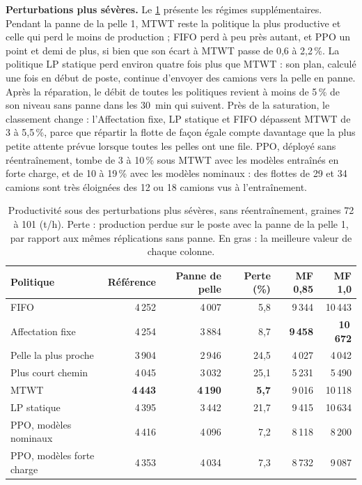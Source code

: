 \documentclass[11pt,a4paper]{article}
\newif\ifcorrmarks
\newcommand{\corr}[1]{\ifcorrmarks\textcolor{corrcolor}{#1}\else#1\fi}
\newenvironment{corrbloc}{\par\ifcorrmarks\color{corrcolor}\fi}{\par}
\begin{document}
\begin{corrbloc}
\textbf{Perturbations plus sévères.} Le \cref{tab:disruptions} présente les régimes supplémentaires. Pendant la panne de la pelle 1, MTWT reste la politique la plus productive et celle qui perd le moins de production ; FIFO perd à peu près autant, et PPO un point et demi de plus, si bien que son écart à MTWT passe de 0,6 à 2,2\,\%. La politique \corr{LP statique} perd environ quatre fois plus que MTWT : son plan, calculé une fois en début de poste, continue d'envoyer des camions vers la pelle en panne. Après la réparation, le débit de toutes les politiques revient à moins de 5\,\% de son niveau sans panne dans les 30~min qui suivent. Près de la saturation, le classement change : l'Affectation fixe, \corr{LP statique} et FIFO dépassent MTWT de 3 à 5,5\,\%, parce que répartir la flotte de façon égale compte davantage que la plus petite attente prévue lorsque toutes les pelles ont une file. PPO, déployé sans réentraînement, tombe de 3 à 10\,\% sous MTWT avec les modèles entraînés en forte charge, et de 10 à 19\,\% avec les modèles nominaux : des flottes de 29 et 34 camions sont très éloignées des 12 ou 18 camions vus à l'entraînement.

\begin{table}[H]
\centering
\caption{Productivité sous des perturbations plus sévères, sans réentraînement, graines 72 à 101 (t/h). Perte : production perdue sur le poste avec la panne de la pelle 1, par rapport aux mêmes réplications sans panne. En gras : la meilleure valeur de chaque colonne.}
\label{tab:disruptions}
\small
\begin{tabular}{@{}lrrrrr@{}}
\toprule
\textbf{Politique} & \textbf{Référence} & \textbf{Panne de pelle} & \textbf{Perte (\%)} & \textbf{MF 0,85} & \textbf{MF 1,0} \\
\midrule
FIFO & 4\,252 & 4\,007 & 5{,}8 & 9\,344 & 10\,443 \\
Affectation fixe & 4\,254 & 3\,884 & 8{,}7 & \textbf{9\,458} & \textbf{10\,672} \\
Pelle la plus proche & 3\,904 & 2\,946 & 24{,}5 & 4\,027 & 4\,042 \\
Plus court chemin & 4\,045 & 3\,032 & 25{,}1 & 5\,231 & 5\,490 \\
MTWT & \textbf{4\,443} & \textbf{4\,190} & \textbf{5{,}7} & 9\,016 & 10\,118 \\
\corr{LP statique} & 4\,395 & 3\,442 & 21{,}7 & 9\,415 & 10\,634 \\
\midrule
PPO, modèles nominaux & 4\,416 & 4\,096 & 7{,}2 & 8\,118 & 8\,200 \\
PPO, modèles forte charge & 4\,353 & 4\,034 & 7{,}3 & 8\,732 & 9\,087 \\
\bottomrule
\end{tabular}
\end{table}
\end{corrbloc}
\end{document}
